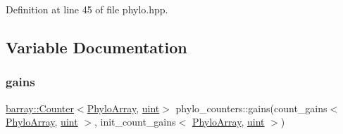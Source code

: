 Definition at line 45 of file phylo.\+hpp.



\subsection{Variable Documentation}
\mbox{\label{namespacephylo__counters_a9f421f66084362533d195b9c05c558fa}} 
\subsubsection{\texorpdfstring{gains}{gains}}
{\footnotesize\ttfamily \hyperlink{classbarray_1_1_counter}{barray\+::\+Counter}$<$\hyperlink{phylo_8hpp_a607c2e56bbc298034fb841e2e49d15e7}{Phylo\+Array}, \hyperlink{phylo_8hpp_a91ad9478d81a7aaf2593e8d9c3d06a14}{uint}$>$ phylo\+\_\+counters\+::gains(count\+\_\+gains$<$ \hyperlink{phylo_8hpp_a607c2e56bbc298034fb841e2e49d15e7}{Phylo\+Array}, \hyperlink{phylo_8hpp_a91ad9478d81a7aaf2593e8d9c3d06a14}{uint} $>$, init\+\_\+count\+\_\+gains$<$ \hyperlink{phylo_8hpp_a607c2e56bbc298034fb841e2e49d15e7}{Phylo\+Array}, \hyperlink{phylo_8hpp_a91ad9478d81a7aaf2593e8d9c3d06a14}{uint} $>$)}

